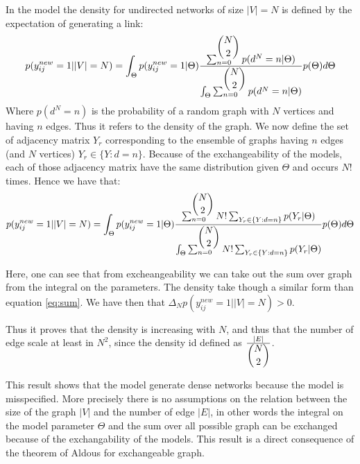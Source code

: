 \documentclass[a4paper, 12pt]{article}
\begin{document}
In the model the density for undirected networks of size $|V|=N$ is defined by the expectation of generating a link:
\begin{equation}
p(y_{ij}^{new}=1| |V|=N) =  \int_{\Theta} p(y_{ij}^{new}=1|\Theta) \frac{\sum_{n=0}^{\dbinom{N}{2}} p(d^N=n| \Theta)}{\int_{\Theta} \sum_{n=0}^{\dbinom{N}{2}} p(d^N=n | \Theta)} p(\Theta) d\Theta
\end{equation}
Where  $p(d^N=n)$ is the probability of a random graph with $N$ vertices and having $n$ edges. Thus it refers to the density of the graph. We now define the set of  adjacency matrix $Y_r$ corresponding to the ensemble of graphs having $n$ edges (and $N$ vertices) $Y_r \in \{Y: d=n\}$. Because of the exchangeability of the models, each of those adjacency matrix have the same distribution given $\Theta$ and occurs $N!$ times. Hence we have that:
\begin{equation}
p(y_{ij}^{new}=1| |V|=N) =  \int_{\Theta} p(y_{ij}^{new}=1|\Theta) \frac{\sum_{n=0}^{\dbinom{N}{2}} N! \sum_{Y_r \in \{Y: d=n\}} p(Y_r| \Theta)}{\int_{\Theta} \sum_{n=0}^{\dbinom{N}{2}} N! \sum_{Y_r \in \{Y: d=n\}} p(Y_r | \Theta)} p(\Theta) d\Theta
\end{equation}


Here, one can see that from excheangeability we can take out the sum over graph from the integral on the parameters. The density take though a similar form than equation  \eqref{eq:sum}. We have then that $\Delta_N p(y_{ij}^{new}=1| |V|=N) >0 $.

Thus it proves that the density is increasing with $N$, and thus that the number of edge scale at least in $N^2$, since the density id defined as $\frac{|E|}{\dbinom{N}{2}}$. 

This result shows that the model generate dense networks because the model is misspecified. More precisely there is no assumptions on the relation between the size of the graph $|V|$ and the number of edge $|E|$, in other words the integral on the model parameter $\Theta$ and the sum over all possible graph can be exchanged because of the exchangability of the models. This result is a direct consequence of the theorem of Aldous for exchangeable graph.
\end{document}
